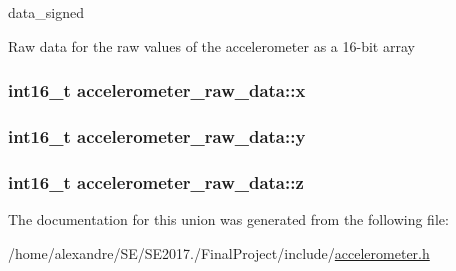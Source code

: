 data\+\_\+signed 

Raw data for the raw values of the accelerometer as a 16-\/bit array 
\subsubsection[{\texorpdfstring{x}{x}}]{\setlength{\rightskip}{0pt plus 5cm}int16\+\_\+t accelerometer\+\_\+raw\+\_\+data\+::x}\hypertarget{unionaccelerometer__raw__data_abe5cbfe31d12ba368d2a5679b8195d5f}{}\label{unionaccelerometer__raw__data_abe5cbfe31d12ba368d2a5679b8195d5f}
\subsubsection[{\texorpdfstring{y}{y}}]{\setlength{\rightskip}{0pt plus 5cm}int16\+\_\+t accelerometer\+\_\+raw\+\_\+data\+::y}\hypertarget{unionaccelerometer__raw__data_a4fd1e05861d56ec35b0562563d70e15f}{}\label{unionaccelerometer__raw__data_a4fd1e05861d56ec35b0562563d70e15f}
\subsubsection[{\texorpdfstring{z}{z}}]{\setlength{\rightskip}{0pt plus 5cm}int16\+\_\+t accelerometer\+\_\+raw\+\_\+data\+::z}\hypertarget{unionaccelerometer__raw__data_a18caf4ddfec4b38993aae2ad5e62819e}{}\label{unionaccelerometer__raw__data_a18caf4ddfec4b38993aae2ad5e62819e}


The documentation for this union was generated from the following file\+:\begin{DoxyCompactItemize}
\item 
/home/alexandre/\+S\+E/\+S\+E2017./\+Final\+Project/include/\hyperlink{accelerometer_8h}{accelerometer.\+h}\end{DoxyCompactItemize}

